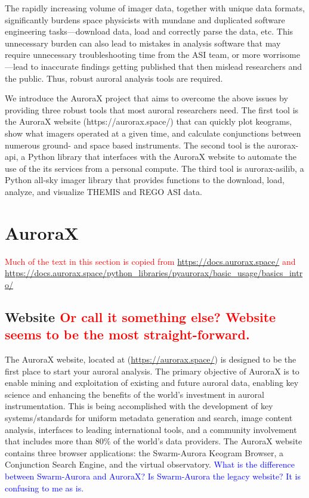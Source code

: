 \documentclass[draft]{agujournal2019}
\begin{document}
The rapidly increasing volume of imager data, together with unique data formats, significantly burdens space physicists with mundane and duplicated software engineering tasks---download data, load and correctly parse the data, etc. This unnecessary burden can also lead to mistakes in analysis software that may require unnecessary troubleshooting time from the ASI team, or more worrisome---lead to inaccurate findings getting published that then mislead researchers and the public. Thus, robust auroral analysis tools are required.

We introduce the AuroraX project that aims to overcome the above issues by providing three robust tools that most auroral researchers need. The first tool is the AuroraX website (https://aurorax.space/) that can quickly plot keograms, show what imagers operated at a given time, and calculate conjunctions between numerous ground- and space based instruments. The second tool is the aurorax-api, a Python library that interfaces with the AuroraX website to automate the use of the its services from a personal compute. The third tool is aurorax-asilib, a Python all-sky imager library that provides functions to the download, load, analyze, and visualize THEMIS and REGO ASI data. 

\section{AuroraX}\label{aurorax}
\textcolor{red}{Much of the text in this section is copied from \url{https://docs.aurorax.space/} and \url{https://docs.aurorax.space/python_libraries/pyaurorax/basic_usage/basics_intro/}}

\subsection{Website \textcolor{red}{Or call it something else? Website seems to be the most straight-forward.}}
The AuroraX website, located at (\url{https://aurorax.space/}) is designed to be the first place to start your auroral analysis. The primary objective of AuroraX is to enable mining and exploitation of existing and future auroral data, enabling key science and enhancing the benefits of the world's investment in auroral instrumentation. This is being accomplished with the development of key systems/standards for uniform metadata generation and search, image content analysis, interfaces to leading international tools, and a community involvement that includes more than 80\% of the world's data providers. The AuroraX website contains three browser applications: the Swarm-Aurora Keogram Browser, a Conjunction Search Engine, and the virtual observatory. \textcolor{blue}{What is the difference between Swarm-Aurora and AuroraX? Is Swarm-Aurora the legacy website? It is confusing to me as is.} 
\end{document}
